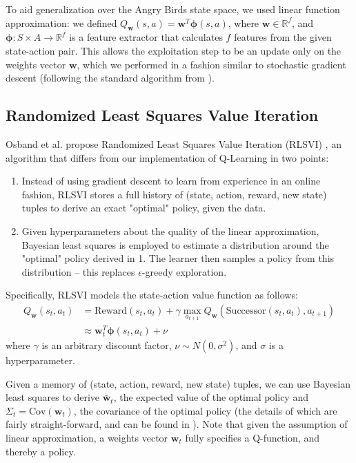 \documentclass[fleqn,10pt]{SelfArx} %
\begin{document}
To aid generalization over the Angry Birds state space, we used linear function approximation: we defined $Q_\mathbf{w}(s,a)=\mathbf{w}^T \mathbf{\phi}(s,a)$, where $\mathbf{w}\in \mathbb{R}^f$, and $\mathbf{\phi}:S\times A\rightarrow \mathbb{R}^f$ is a feature extractor that calculates $f$ features from the given state-action pair. This allows the exploitation step to be an update only on the weights vector $\mathbf{w}$, which we performed in a fashion similar to stochastic gradient descent (following the standard algorithm from \cite{sutton1998reinforcement}).

\subsection{Randomized Least Squares Value Iteration}

Osband et al. propose Randomized Least Squares Value Iteration (RLSVI) \cite{osband2014generalization}, an algorithm that differs from our implementation of Q-Learning in two points:
\begin{enumerate}
\item{Instead of using gradient descent to learn from experience in an online fashion, RLSVI stores a full history of (state, action, reward, new state) tuples to derive an exact "optimal" policy, given the data.}
\item{Given hyperparameters about the quality of the linear approximation, Bayesian least squares is employed to estimate a distribution around the "optimal" policy derived in 1. The learner then samples a policy from this distribution -- this replaces $\epsilon$-greedy exploration.}
\end{enumerate}

Specifically, RLSVI models the state-action value function as follows:
\begin{equation*}
\begin{split}
Q_\mathbf{w}(s_t,a_t) &=\text{Reward}(s_t,a_t) + \gamma \max_{a_{t+1}} Q_\mathbf{w}(\text{Successor}(s_t,a_t),a_{t+1}) \\
& \approx 
\mathbf{w}_t^T \mathbf{\phi}(s_t,a_t) + \nu
\end{split}
\end{equation*}
where $\gamma$ is an arbitrary discount factor, $\nu \sim N(0,\sigma^2)$, and $\sigma$ is a hyperparameter. 

Given a memory of (state, action, reward, new state) tuples, we can use Bayesian least squares to derive $\bar{\mathbf{w}}_t$, the expected value of the optimal policy and $\Sigma_t=\mathrm{Cov}(\mathbf{w}_t)$, the covariance of the optimal policy (the details of which are fairly straight-forward, and can be found in \cite{osband2014generalization}). Note that given the assumption of linear approximation, a weights vector $\mathbf{w}_t$ fully specifies a Q-function, and thereby a policy.
\end{document}
